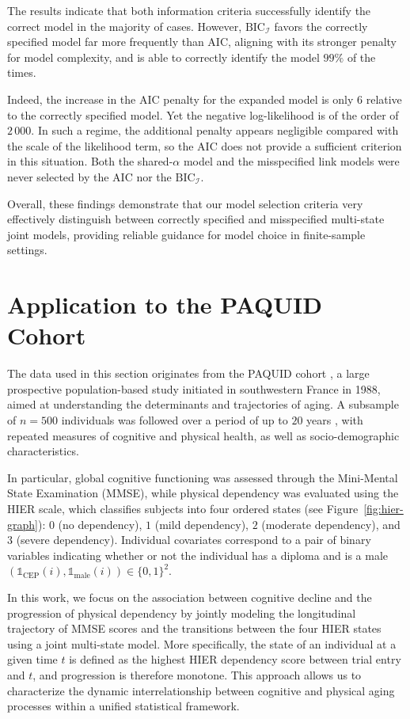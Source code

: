 \documentclass{sn-jnl}
\begin{document}
The results indicate that both information criteria successfully identify the correct model in the majority of cases. However, $\mathrm{BIC}_\mathcal{I}$ favors the correctly specified model far more frequently than AIC, aligning with its stronger penalty for model complexity, and is able to correctly identify the model $99\%$ of the times. 

Indeed, the increase in the AIC penalty for the expanded model is only $6$ relative to the correctly specified model. Yet the negative log-likelihood is of the order of $2 \, 000$. In such a regime, the additional penalty appears negligible compared with the scale of the likelihood term, so the AIC does not provide a sufficient criterion in this situation. Both the shared-$\alpha$ model and the misspecified link models were never selected by the AIC nor the $\mathrm{BIC}_\mathcal{I}$.

Overall, these findings demonstrate that our model selection criteria very effectively distinguish between correctly specified and misspecified multi-state joint models, providing reliable guidance for model choice in finite-sample settings.

\section{Application to the PAQUID Cohort} \label{sec:paquid}

The data used in this section originates from the PAQUID cohort
\citep{Letenneur1994}, a large prospective population-based study initiated in southwestern France in 1988, aimed at understanding the determinants and trajectories of aging. A subsample of $n = 500$ individuals was followed over a period of up to $20$ years \citep{Proust-Lima2017}, with repeated measures of cognitive and physical health, as well as socio-demographic characteristics. 

In particular, global cognitive functioning was assessed through the Mini-Mental State Examination (MMSE), while physical dependency was evaluated using the HIER scale, which classifies subjects into four ordered states (see Figure~\ref{fig:hier-graph}): $0$ (no dependency), $1$ (mild dependency), $2$ (moderate dependency), and $3$ (severe dependency). Individual covariates correspond to a pair of binary variables indicating whether or not the individual has a diploma and is a male $\left( \mathds{1}_\mathrm{CEP}(i), \mathds{1}_\mathrm{male}(i) \right) \in \{0, 1\}^2$.

In this work, we focus on the association between cognitive decline and the progression of physical dependency by jointly modeling the longitudinal trajectory of MMSE scores and the transitions between the four HIER states using a joint multi-state model. More specifically, the state of an individual at a given time $t$ is defined as the highest HIER dependency score between trial entry and $t$, and progression is therefore monotone. This approach allows us to characterize the dynamic interrelationship between cognitive and physical aging processes within a unified statistical framework.
\end{document}
